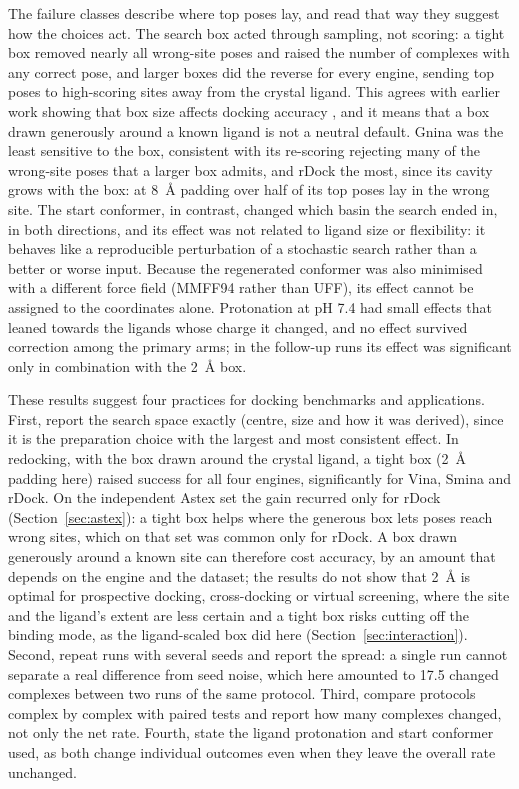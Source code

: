 The failure classes describe where top poses lay, and read that way they suggest how the
choices act. The search box acted through sampling, not scoring: a tight box removed nearly all wrong-site poses and raised the
number of complexes with any correct pose, and larger boxes did the reverse for every
engine, sending top poses to high-scoring sites away from the crystal ligand. This agrees
with earlier work showing that box size affects docking accuracy
\citep{feinstein2015boxsize}, and it means that a box drawn generously around a known
ligand is not a neutral default. Gnina was the least sensitive to the box, consistent
with its re-scoring rejecting many of the wrong-site poses that a larger box admits, and
rDock the most, since its cavity grows with the box: at \SI{8}{\angstrom} padding over
half of its top poses lay in the wrong site. The
start conformer, in contrast, changed which basin the search ended in, in both directions,
and its effect was not related to ligand size or flexibility: it behaves like a
reproducible perturbation of a stochastic search rather than a better or worse input.
Because the regenerated conformer was also minimised with a different force field (MMFF94
rather than UFF), its effect cannot be assigned to the coordinates alone.
Protonation at pH 7.4 had small effects that leaned towards the ligands whose charge it
changed, and no effect survived correction among the primary arms; in the follow-up runs
its effect was significant only in combination with the \SI{2}{\angstrom} box.

These results suggest four practices for docking benchmarks and applications. First,
report the search space exactly (centre, size and how it was derived), since it is the
preparation choice with the largest and most consistent effect. In redocking, with the box
drawn around the crystal ligand, a tight box (\SI{2}{\angstrom} padding here) raised success
for all four engines, significantly for Vina, Smina and rDock. On the independent Astex set
the gain recurred only for rDock (Section~\ref{sec:astex}): a tight box helps where the
generous box lets poses reach wrong sites, which on that set was common only for rDock. A
box drawn generously around a known site can therefore cost accuracy, by an amount that
depends on the engine and the dataset; the results do not show that \SI{2}{\angstrom} is
optimal for prospective docking, cross-docking or virtual screening, where the site and the
ligand's extent are less certain and a tight box risks cutting off the binding mode, as the
ligand-scaled box did here (Section~\ref{sec:interaction}). Second, repeat runs with several seeds and report the spread: a single run cannot
separate a real difference from seed noise, which here amounted to 17.5 changed complexes
between two runs of the same protocol. Third, compare protocols complex by complex with
paired tests and report how many complexes changed, not only the net rate. Fourth, state
the ligand protonation and start conformer used, as both change individual outcomes even
when they leave the overall rate unchanged.

